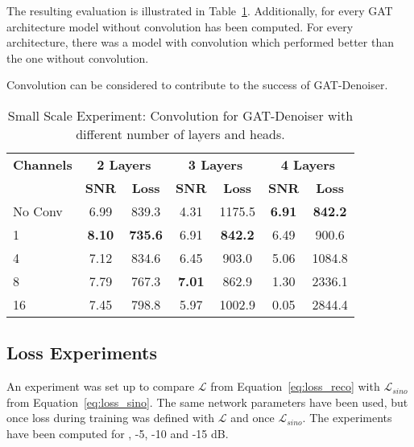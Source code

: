 The resulting evaluation is illustrated in Table~\ref{tab:small_convolution_2}.
Additionally, for every GAT architecture model without convolution has been computed.
For every architecture, there was a model with convolution which performed better than the one without convolution.


\begin{tcolorbox}[colback=red!5!white,colframe=red!75!black]
  Convolution can be considered to contribute to the success of GAT-Denoiser.
\end{tcolorbox}



\begin{table}[H]
  \centering
  \begin{tabular}{l|cc|cc|cc}
    \toprule
    \small \textbf{Channels } & \multicolumn{2}{c|}{\small \textbf{2 Layers}} & \multicolumn{2}{c|}{\small \textbf{3 Layers}} & \multicolumn{2}{c}{\small \textbf{4 Layers}}  \\
                       & \small \textbf{SNR} & \small \textbf{Loss} & \small \textbf{SNR} & \small \textbf{Loss} & \small \textbf{SNR} & \small \textbf{Loss} \\ 
    \midrule
		No Conv & 6.99  & 839.3 & 4.31   & 1175.5 & \textbf{6.91} & \textbf{842.2}     \\ \hline
		1       & \textbf{8.10}  & \textbf{735.6} & 6.91   & \textbf{842.2} & 6.49 & 900.6     \\ \hline
		4       & 7.12  & 834.6 & 6.45   & 903.0 & 5.06 & 1084.8   \\ \hline
		8       & 7.79  & 767.3 & \textbf{7.01}   & 862.9 & 1.30 & 2336.1    \\ \hline
		16      & 7.45  & 798.8 & 5.97   & 1002.9 & 0.05  & 2844.4   \\ \hline
    \midrule
  \end{tabular}

  \caption{Small Scale Experiment: Convolution for GAT-Denoiser with different number of layers and heads.}
  \label{tab:small_convolution_2}
\end{table}


\subsection{Loss Experiments}
An experiment was set up to compare $\mathcal{L}$ from Equation~\ref{eq:loss_reco} 
with $\mathcal{L}_{sino}$ from Equation~\ref{eq:loss_sino}.
The same network parameters have been used, but once loss during training was defined 
with $\mathcal{L}$ and once $\mathcal{L}_{sino}$. The experiments
have been computed for , -5, -10 and -15 dB.

